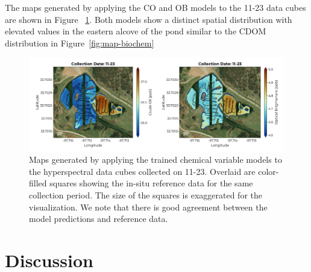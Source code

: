 \documentclass[remotesensing,article,submit,pdftex,moreauthors]{Definitions/mdpi}
\begin{document}
The maps generated by applying the CO and OB models to the 11-23 data cubes are shown in Figure ~\ref{fig:map-chem}. Both models show a distinct spatial distribution with elevated values in the eastern alcove of the pond similar to the CDOM distribution in Figure~\ref{fig:map-biochem}

\begin{figure}
\centering
\vspace{-0.3in}
\includegraphics[width=\columnwidth]{paper/figures/results/maps/chemical.pdf}
\caption{Maps generated by applying the trained chemical variable models to the hyperspectral data cubes collected on 11-23. Overlaid are color-filled squares showing the in-situ reference data for the same collection period. The size of the squares is exaggerated for the visualization. We note that there is good agreement between the model predictions and reference data.\label{fig:map-chem}}
\end{figure}  





\section{Discussion} \label{sec:discussion}
\end{document}
